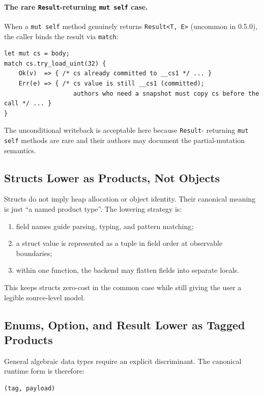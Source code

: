 \documentclass[12pt,oneside]{article}
\begin{document}
\paragraph{The rare \texttt{Result}-returning \texttt{mut self} case.}
When a \verb|mut self| method genuinely returns \verb|Result<T, E>|
(uncommon in 0.5.0), the caller binds the result via \verb|match|:

\begin{verbatim}
let mut cs = body;
match cs.try_load_uint(32) {
    Ok(v)  => { /* cs already committed to __cs1 */ ... }
    Err(e) => { /* cs value is still __cs1 (committed);
                   authors who need a snapshot must copy cs before the call */ ... }
}
\end{verbatim}

The unconditional writeback is acceptable here because \verb|Result|-
returning \verb|mut self| methods are rare and their authors may
document the partial-mutation semantics.

\subsection{Structs Lower as Products, Not Objects}
Structs do not imply heap allocation or object identity. Their canonical
meaning is just ``a named product type''. The lowering strategy is:

\begin{enumerate}
\item field names guide parsing, typing, and pattern matching;
\item a struct value is represented as a tuple in field order at observable
boundaries;
\item within one function, the backend may flatten fields into separate locals.
\end{enumerate}

This keeps structs zero-cost in the common case while still giving the user a
legible source-level model.

\subsection{Enums, Option, and Result Lower as Tagged Products}
General algebraic data types require an explicit discriminant. The canonical
runtime form is therefore:

\begin{verbatim}
(tag, payload)
\end{verbatim}
\end{document}
